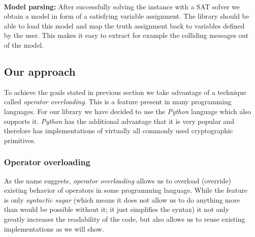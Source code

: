 ~\\
\textbf{Model parsing:}
After successfully solving the instance with a SAT solver we obtain a model in form of a satisfying variable assignment.
The library should be able to load this model and map the truth assignment back to variables defined by the user.
This makes it easy to extract for example the colliding messages out of the model.


\subsection{Our approach}
To achieve the goals stated in previous section we take advantage of a technique called \emph{operator overloading}.
This is a feature present in many programming languages.
For our library we have decided to use the \emph{Python} language which also supports it.
\emph{Python} has the additional advantage that it is very popular and therefore has implementations of virtually all commonly used cryptographic primitives.

\subsubsection{Operator overloading}
\label{sec:operator-overloading}
As the name suggests, \emph{operator overloading} allows us to overload (override) existing behavior of operators in some programming language.
While the feature is only \emph{syntactic sugar} (which means it does not allow us to do anything more than would be possible without it; it just simplifies the syntax) it not only greatly increases the readability of the code, but also allows us to reuse existing implementations as we will show.



